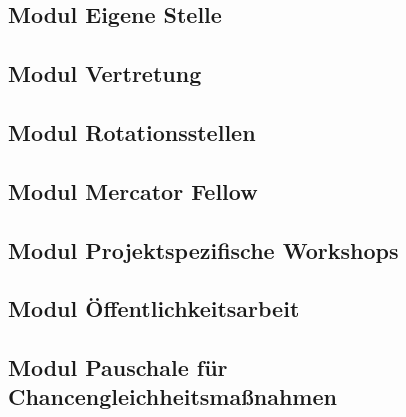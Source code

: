 \documentclass{scrartcl}
\begin{document}

\subsection{Modul Eigene Stelle}

\subsection{Modul Vertretung}

\subsection{Modul Rotationsstellen}

\subsection{Modul Mercator Fellow}

\subsection{Modul Projektspezifische Workshops}

\subsection{Modul Öffentlichkeitsarbeit}

\subsection{Modul Pauschale für Chancengleichheitsmaßnahmen}
\end{document}
